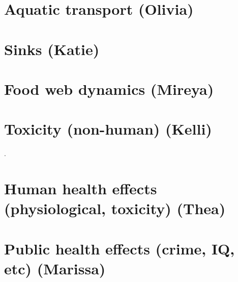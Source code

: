 \documentclass{article}\usepackage[]{graphicx}\usepackage[]{color}
\begin{document}
\section{Aquatic transport (Olivia)}

\section{Sinks (Katie)}

\section{Food web dynamics (Mireya)}

\section{Toxicity (non-human) (Kelli)}

. 


\section{Human health effects (physiological, toxicity) (Thea)}

\section{Public health effects (crime, IQ, etc) (Marissa)}
\end{document}
